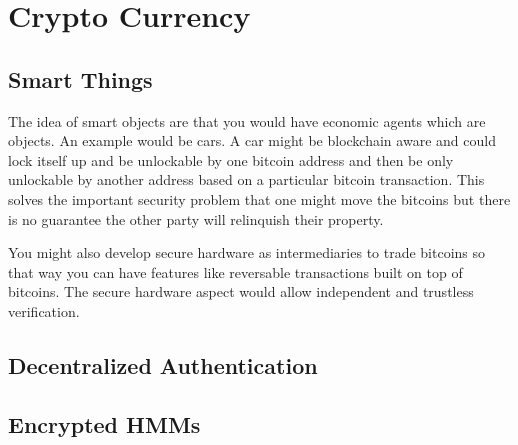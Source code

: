 \chapter{Crypto Currency}
\section{Smart Things}
The idea of smart objects are that you would have economic agents which
are objects. An example would be cars. A car might be blockchain aware
and could lock itself up and be unlockable by one bitcoin address
and then be only unlockable by another address based on a particular
bitcoin transaction. This solves the important security problem that one might
move the bitcoins but there is no guarantee the other party will relinquish
their property.

You might also develop secure hardware as intermediaries to trade bitcoins
so that way you can have features like reversable transactions built on
top of bitcoins.  The secure hardware aspect would allow independent and 
trustless verification.

\section{Decentralized Authentication}

\section{Encrypted HMMs}
